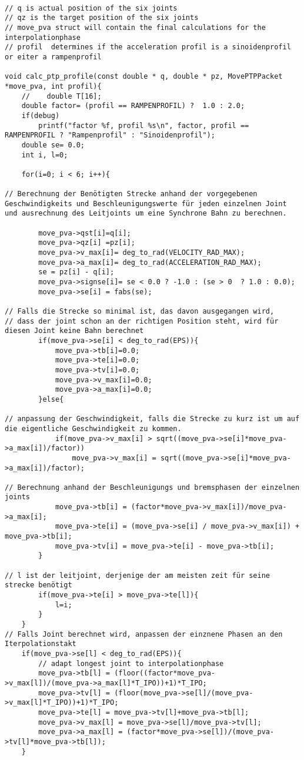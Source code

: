 \documentclass[
a4paper,
12pt,
oneside,
headsepline,		%
footsepline,		%
]{scrbook}
\begin{document}
\begin{lstlisting}

// q is actual position of the six joints
// qz is the target position of the six joints
// move_pva struct will contain the final calculations for the interpolationphase
// profil  determines if the acceleration profil is a sinoidenprofil or eiter a rampenprofil

void calc_ptp_profile(const double * q, double * pz, MovePTPPacket *move_pva, int profil){
    //    double T[16];
    double factor= (profil == RAMPENPROFIL) ?  1.0 : 2.0;
    if(debug)
        printf("factor %f, profil %s\n", factor, profil == RAMPENPROFIL ? "Rampenprofil" : "Sinoidenprofil");
    double se= 0.0;
    int i, l=0;

    for(i=0; i < 6; i++){

// Berechnung der Benötigten Strecke anhand der vorgegebenen Geschwindigkeits und Beschleunigungswerte für jeden einzelnen Joint und ausrechnung des Leitjoints um eine Synchrone Bahn zu berechnen.
  
        move_pva->qst[i]=q[i];
        move_pva->qz[i] =pz[i];
        move_pva->v_max[i]= deg_to_rad(VELOCITY_RAD_MAX);
        move_pva->a_max[i]= deg_to_rad(ACCELERATION_RAD_MAX);
        se = pz[i] - q[i];
        move_pva->signse[i]= se < 0.0 ? -1.0 : (se > 0  ? 1.0 : 0.0);
        move_pva->se[i] = fabs(se);

// Falls die Strecke so minimal ist, das davon ausgegangen wird, 
// dass der joint schon an der richtigen Position steht, wird für diesen Joint keine Bahn berechnet
        if(move_pva->se[i] < deg_to_rad(EPS)){
            move_pva->tb[i]=0.0;
            move_pva->te[i]=0.0;
            move_pva->tv[i]=0.0;
            move_pva->v_max[i]=0.0;
            move_pva->a_max[i]=0.0;
        }else{

// anpassung der Geschwindigkeit, falls die Strecke zu kurz ist um auf die eigentliche Geschwindigkeit zu kommen.
            if(move_pva->v_max[i] > sqrt((move_pva->se[i]*move_pva->a_max[i])/factor))
                move_pva->v_max[i] = sqrt((move_pva->se[i]*move_pva->a_max[i])/factor);

// Berechnung anhand der Beschleunigungs und bremsphasen der einzelnen joints
            move_pva->tb[i] = (factor*move_pva->v_max[i])/move_pva->a_max[i];
            move_pva->te[i] = (move_pva->se[i] / move_pva->v_max[i]) + move_pva->tb[i];
            move_pva->tv[i] = move_pva->te[i] - move_pva->tb[i];
        }

// l ist der leitjoint, derjenige der am meisten zeit für seine strecke benötigt
        if(move_pva->te[i] > move_pva->te[l]){
            l=i;
        }
    }
// Falls Joint berechnet wird, anpassen der einznene Phasen an den Iterpolationstakt
    if(move_pva->se[l] < deg_to_rad(EPS)){
        // adapt longest joint to interpolationphase
        move_pva->tb[l] = (floor((factor*move_pva->v_max[l])/(move_pva->a_max[l]*T_IPO))+1)*T_IPO;
        move_pva->tv[l] = (floor(move_pva->se[l]/(move_pva->v_max[l]*T_IPO))+1)*T_IPO;
        move_pva->te[l] = move_pva->tv[l]+move_pva->tb[l];
        move_pva->v_max[l] = move_pva->se[l]/move_pva->tv[l];
        move_pva->a_max[l] = (factor*move_pva->se[l])/(move_pva->tv[l]*move_pva->tb[l]);
    }


\end{lstlisting}
\end{document}
